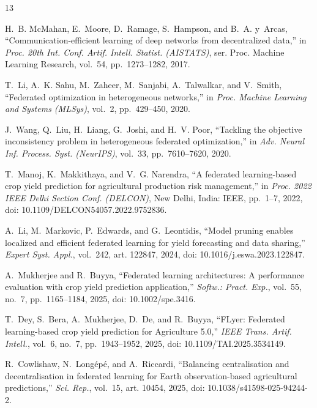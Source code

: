\documentclass[journal]{IEEEtran}
\begin{document}
\begin{thebibliography}{13}

H.~B. McMahan, E.~Moore, D.~Ramage, S.~Hampson, and B.~A. y~Arcas,
``Communication-efficient learning of deep networks from decentralized data,''
in \emph{Proc. 20th Int. Conf. Artif. Intell. Statist. (AISTATS)},
ser. Proc. Machine Learning Research, vol.~54, pp.~1273--1282, 2017.

T.~Li, A.~K. Sahu, M.~Zaheer, M.~Sanjabi, A.~Talwalkar, and V.~Smith,
``Federated optimization in heterogeneous networks,''
in \emph{Proc. Machine Learning and Systems (MLSys)}, vol.~2,
pp.~429--450, 2020.

J.~Wang, Q.~Liu, H.~Liang, G.~Joshi, and H.~V. Poor,
``Tackling the objective inconsistency problem in heterogeneous federated
optimization,''
in \emph{Adv. Neural Inf. Process. Syst. (NeurIPS)}, vol.~33,
pp.~7610--7620, 2020.

T.~Manoj, K.~Makkithaya, and V.~G. Narendra,
``A federated learning-based crop yield prediction for agricultural production
risk management,''
in \emph{Proc. 2022 IEEE Delhi Section Conf. (DELCON)},
New Delhi, India: IEEE, pp.~1--7, 2022,
doi: 10.1109/DELCON54057.2022.9752836.

A.~Li, M.~Markovic, P.~Edwards, and G.~Leontidis,
``Model pruning enables localized and efficient federated learning for yield
forecasting and data sharing,''
\emph{Expert Syst. Appl.}, vol.~242, art. 122847, 2024,
doi: 10.1016/j.eswa.2023.122847.

A.~Mukherjee and R.~Buyya,
``Federated learning architectures: A performance evaluation with crop yield
prediction application,''
\emph{Softw.: Pract. Exp.}, vol.~55, no.~7, pp.~1165--1184, 2025,
doi: 10.1002/spe.3416.

T.~Dey, S.~Bera, A.~Mukherjee, D.~De, and R.~Buyya,
``{FLyer}: Federated learning-based crop yield prediction for Agriculture 5.0,''
\emph{IEEE Trans. Artif. Intell.}, vol.~6, no.~7, pp.~1943--1952, 2025,
doi: 10.1109/TAI.2025.3534149.

R.~Cowlishaw, N.~Long\'{e}p\'{e}, and A.~Riccardi,
``Balancing centralisation and decentralisation in federated learning for Earth
observation-based agricultural predictions,''
\emph{Sci. Rep.}, vol.~15, art. 10454, 2025,
doi: 10.1038/s41598-025-94244-2.


\end{thebibliography}
\end{document}

